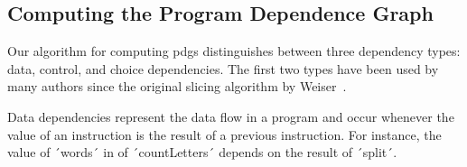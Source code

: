 %
%
%
%
%

\subsection{Computing the Program Dependence Graph}

Our algorithm for computing \acp{pdg} distinguishes between three dependency types: data, control, and choice dependencies.
The first two types have been used by many authors since the original slicing algorithm by Weiser~\cite{weiser81:program_slicing}.

Data dependencies represent the data flow in a program and occur whenever the value of an instruction is the result of a previous instruction.
For instance, the value of ´words´ in  of ´countLetters´ depends on the result of ´split´. %

